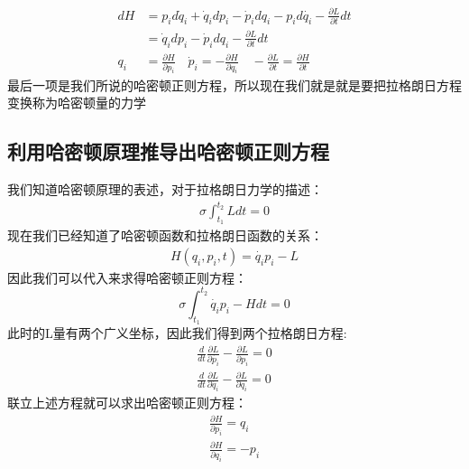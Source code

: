 \documentclass[UTF8,10pt]{article}
\begin{document}
\begin{equation*}
    \begin{aligned}
        d H   & =p_{i}d \dot{q}_{i}+\dot{q}_{i} d{p_i}-\dot{p}_{i} d q_{i}-p_{i} d\dot{q_i}-\frac{\partial L}{\partial t} d t                                             \\
              & =\dot{q}_{i} d p_{i}-\dot{p}_{i} d q_{i}-\frac{\partial L}{\partial t} d t                                                                                \\
        q_{i} & =\frac{\partial H}{\partial p_{i}} \quad \dot{p}_{i}=-\frac{\partial H}{\partial q_{i}} \quad-\frac{\partial L}{\partial t}=\frac{\partial H}{\partial t}
    \end{aligned}
\end{equation*}
最后一项是我们所说的哈密顿正则方程，所以现在我们就是就是要把拉格朗日方程变换称为哈密顿量的力学
\subsection{利用哈密顿原理推导出哈密顿正则方程}
我们知道哈密顿原理的表述，对于拉格朗日力学的描述：
\begin{align}
    \sigma \int_{t_1}^{t_2} L dt = 0
\end{align}
现在我们已经知道了哈密顿函数和拉格朗日函数的关系：
\begin{align*}
    H(q_i,p_i,t)=\dot{q_i}p_i-L
\end{align*}
因此我们可以代入来求得哈密顿正则方程：
$$
    \sigma \int _{t_1}^{t_2} \dot{q_i}p_i-H dt = 0
$$
此时的L量有两个广义坐标，因此我们得到两个拉格朗日方程:
\begin{gather*}
    \frac{d}{dt}\frac{\partial L}{\partial \dot{p_i}}-\frac{\partial L}{\partial p_i}=0\\
    \frac{d}{dt}\frac{\partial L}{\partial \dot{q_i}}-\frac{\partial L}{\partial q_i}=0
\end{gather*}
联立上述方程就可以求出哈密顿正则方程：
\begin{align*}
    \frac{\partial H}{\partial p_i}=q_i \\
    \frac{\partial H}{\partial q_i}=-p_i
\end{align*}
\end{document}
